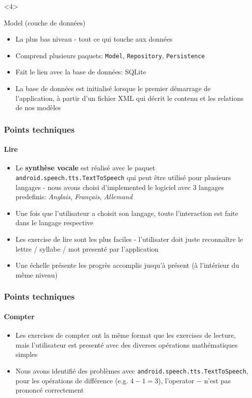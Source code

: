\documentclass[15pt]{beamer}
\begin{document}
\begin{frame}
\begin{overlayarea}{\textwidth}{8cm}
  \begin{onlyenv}<4>
    \begin{exampleblock}{Model (couche de donn\'ees)}
      \begin{itemize}
       \item La plus bas niveau - tout ce qui touche aux donn\'ees
       \item Comprend plusieurs paquets: \texttt{Model}, \texttt{Repository}, \texttt{Persistence}
       \item Fait le lien avec la base de donn\'ees: SQLite\
       \item La base de donn\'ees est initialis\'e lorsque le premier d\'emarrage de l'application,
	  \`a partir d'un fichier XML qui d\'ecrit le contenu et les relations de nos mod\`eles
      \end{itemize}
    \end{exampleblock}
  \end{onlyenv}
\end{overlayarea}
\end{frame}


\begin{frame}
 \frametitle{Points techniques}
  \framesubtitle{Lire}

\begin{itemize}
 \item Le \textbf{synth\`ese vocale} est r\'ealis\'e avec le paquet \texttt{android.speech.tts.TextToSpeech} 
  qui peut \^etre utilis\'e pour plusieurs langages - nous avons
  choisi d'implemented le logiciel avec 3 langages predefinis: \textit{Anglais}, \textit{Fran\c cais}, \textit{Allemand}
 \item Une fois que l'utilisateur a choisit son langage, toute l'interaction est faite dans le langage
  respective
 \item Les exercise de lire sont les plus faciles - l'utilisater doit juste reconna\^itre le lettre / syllabe / mot
  present\'e par l'application
 \item Une \'echelle pr\'esente les progr\`es accomplis jusqu'\`a pr\'esent (\`a l'int\'erieur du m\^eme niveau)
\end{itemize}
\end{frame}


\begin{frame}
 \frametitle{Points techniques}
  \framesubtitle{Compter}

\begin{itemize}
 \item Les exercises de compter ont la m\^eme format que les exercises de lecture, mais l'utilisateur est present\'e
  avec des diverses op\'erations math\'ematiques simples
 \item Nous avons identifi\'e des probl\`emes avec \texttt{android.speech.tts.TextToSpeech}, pour les op\'erations de
  diff\'erence (e.g. $4-1=3$), l'operator \og$-$\fg{} n'est pas prononc\'e correctement
\end{itemize}
\end{frame}
\end{document}
